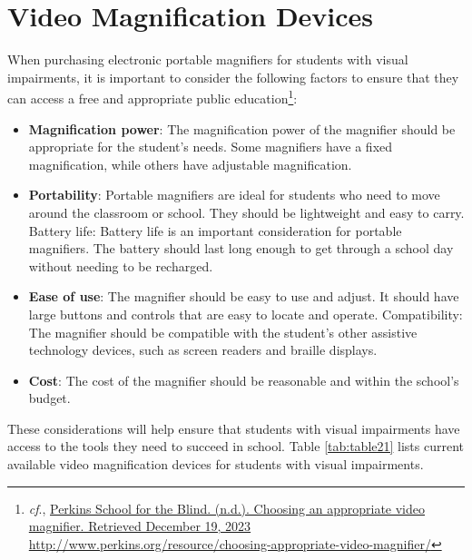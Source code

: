 \documentclass[12pt,letterpaper,twoside,openright]{report}
\begin{document}
\pagebreak\hypertarget{video-magnification-devices}{}\section{Video Magnification
  Devices}\label{video-magnification-devices}
When purchasing electronic portable magnifiers for students with visual impairments, it is important to consider the following factors to ensure that they can access a free and appropriate public education\footnote{\raggedright \textit{cf}., \href{http://www.perkins.org/resource/choosing-appropriate-video-magnifier/}{Perkins School for the Blind. (n.d.). Choosing an appropriate video magnifier. Retrieved December 19, 2023} \url{http://www.perkins.org/resource/choosing-appropriate-video-magnifier/}}:
\begin{itemize}[leftmargin=*]
\item \textbf{Magnification power}: The magnification power of the magnifier should be appropriate for the student’s needs. Some magnifiers have a fixed magnification, while others have adjustable magnification.
\item \textbf{Portability}: Portable magnifiers are ideal for students who need to move around the classroom or school. They should be lightweight and easy to carry.
Battery life: Battery life is an important consideration for portable magnifiers. The battery should last long enough to get through a school day without needing to be recharged.
\item \textbf{Ease of use}: The magnifier should be easy to use and adjust. It should have large buttons and controls that are easy to locate and operate.
Compatibility: The magnifier should be compatible with the student’s other assistive technology devices, such as screen readers and braille displays.
\item \textbf{Cost}: The cost of the magnifier should be reasonable and within the school’s budget.
\end{itemize}
These considerations will help ensure that students with visual impairments have access to the tools they need to succeed in school. Table \ref{tab:table21} lists current available video magnification devices for students with visual impairments.
\end{document}
